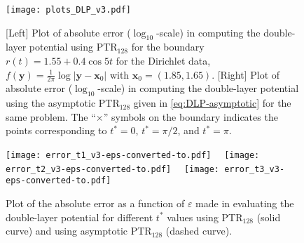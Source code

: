 \documentclass{article}[12pt]
\renewcommand{\epsilon}{\varepsilon}
\numberwithin{equation}{section}
\begin{document}
\begin{figure}[ht!]
  \centering
  \texttt{[image: plots\_DLP\_v3.pdf]}
  \caption{[Left] Plot of absolute error
      ($\log_{10}$-scale) in computing the double-layer potential
      using PTR$_{128}$ for the boundary
    $r(t) = {1.55 + 0.4 \cos 5 t }$ for the Dirichlet data,
    $f(\mathbf{y}) = \frac{1}{2\pi} \log | \mathbf{y} - \mathbf{x}_{0}
    |$
    with $\mathbf{x}_{0} = {(1.85, 1.65)}$.  [Right] Plot of
    absolute error ($\log_{10}$-scale) in computing
      the double-layer potential using the asymptotic PTR$_{128}$
      given in \eqref{eq:DLP-asymptotic} for the same problem. The
    ``$\times$'' symbols on the boundary indicates the points
    corresponding to $t^{\ast}=0$, $t^{\ast}=\pi/2$, and
    $t^{\ast}=\pi$. }
  \label{fig:6}
\end{figure}

\begin{figure}[ht!]
  \centering
  \texttt{[image: error\_t1\_v3-eps-converted-to.pdf]} \, \,
  \texttt{[image: error\_t2\_v3-eps-converted-to.pdf]} \, \,
  \texttt{[image: error\_t3\_v3-eps-converted-to.pdf]}  
  \caption{Plot of the absolute error as a function of $\epsilon$ made
    in evaluating the double-layer potential for different $t^\ast$
    values using PTR$_{128}$ (solid curve) and using
    asymptotic PTR$_{128}$ (dashed curve).}
  \label{fig:7}
\end{figure}
\end{document}
